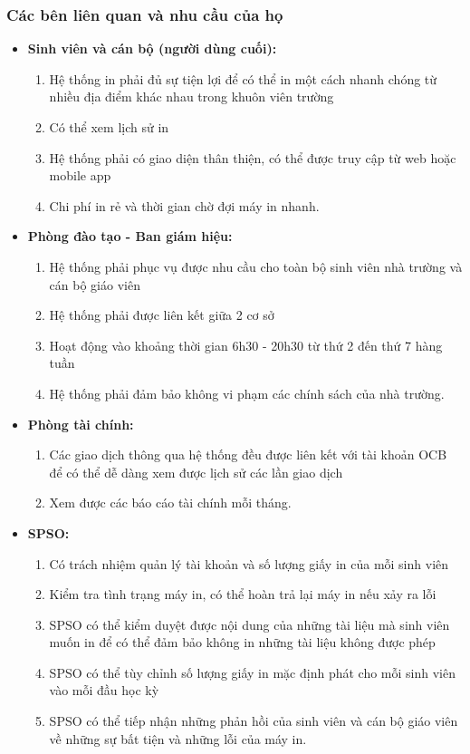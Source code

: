 \subsubsection{Các bên liên quan và nhu cầu của họ}
\begin{itemize}
    \item \textbf{Sinh viên và cán bộ (người dùng cuối):}
    \begin{enumerate}[- ]
        \item Hệ thống in phải đủ sự tiện lợi để có thể in một cách nhanh chóng từ nhiều địa điểm khác nhau trong khuôn viên trường
        \item Có thể xem lịch sử in
        \item Hệ thống phải có giao diện thân thiện, có thể được truy cập từ web hoặc mobile app
        \item Chi phí in rẻ và thời gian chờ đợi máy in nhanh.
    \end{enumerate}

    \item \textbf{Phòng đào tạo - Ban giám hiệu:}
    \begin{enumerate}[- ]
        \item Hệ thống phải phục vụ được nhu cầu cho toàn bộ sinh viên nhà trường và cán bộ giáo viên
        \item Hệ thống phải được liên kết giữa 2 cơ sở
        \item Hoạt động vào khoảng thời gian 6h30 - 20h30 từ thứ 2 đến thứ 7 hàng tuần
        \item Hệ thống phải đảm bảo không vi phạm các chính sách của nhà trường.
    \end{enumerate}

    \item \textbf{Phòng tài chính:}
    \begin{enumerate}[- ]
        \item Các giao dịch thông qua hệ thống đều được liên kết với tài khoản OCB để có thể dễ dàng xem được lịch sử các lần giao dịch
        \item Xem được các báo cáo tài chính mỗi tháng.
    \end{enumerate}

    \item \textbf{SPSO:}
    \begin{enumerate}[- ]
        \item Có trách nhiệm quản lý tài khoản và số lượng giấy in của mỗi sinh viên
        \item Kiểm tra tình trạng máy in, có thể hoàn trả lại máy in nếu xảy ra lỗi
        \item SPSO có thể kiểm duyệt được nội dung của những tài liệu mà sinh viên muốn in để có thể đảm bảo không in những tài liệu không được phép
        \item SPSO có thể tùy chỉnh số lượng giấy in mặc định phát cho mỗi sinh viên vào mỗi đầu học kỳ
        \item SPSO có thể tiếp nhận những phản hồi của sinh viên và cán bộ giáo viên về những sự bất tiện và những lỗi của máy in.
    \end{enumerate}


\end{itemize}

